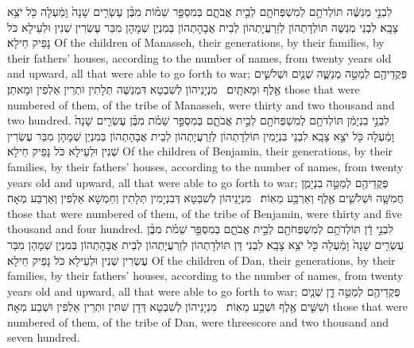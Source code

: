 {לִבְנֵ֣י מְנַשֶּׁ֔ה תּוֹלְדֹתָ֥ם לְמִשְׁפְּחֹתָ֖ם לְבֵ֣ית אֲבֹתָ֑ם בְּמִסְפַּ֣ר שֵׁמ֗וֹת מִבֶּ֨ן עֶשְׂרִ֤ים שָׁנָה֙ וָמַ֔עְלָה כֹּ֖ל יֹצֵ֥א צָבָֽא׃}
{לִבְנֵי מְנַשֶּׁה תּוֹלְדָתְהוֹן לְזַרְעֲיָתְהוֹן לְבֵית אֲבָהָתְהוֹן בְּמִנְיַן שְׁמָהָן מִבַּר עֶשְׂרִין שְׁנִין וּלְעֵילָא כֹּל נָפֵיק חֵילָא׃}
{Of the children of Manasseh, their generations, by their families, by their fathers’ houses, according to the number of names, from twenty years old and upward, all that were able to go forth to war;}{}
{פְּקֻדֵיהֶ֖ם לְמַטֵּ֣ה מְנַשֶּׁ֑ה שְׁנַ֧יִם וּשְׁלֹשִׁ֛ים אֶ֖לֶף וּמָאתָֽיִם׃ \petucha }
{מִנְיָנֵיהוֹן לְשִׁבְטָא דִּמְנַשֶּׁה תְּלָתִין וּתְרֵין אַלְפִין וּמָאתַן׃}
{those that were numbered of them, of the tribe of Manasseh, were thirty and two thousand and two hundred.}{}
{לִבְנֵ֣י בִנְיָמִ֔ן תּוֹלְדֹתָ֥ם לְמִשְׁפְּחֹתָ֖ם לְבֵ֣ית אֲבֹתָ֑ם בְּמִסְפַּ֣ר שֵׁמֹ֗ת מִבֶּ֨ן עֶשְׂרִ֤ים שָׁנָה֙ וָמַ֔עְלָה כֹּ֖ל יֹצֵ֥א צָבָֽא׃}
{לִבְנֵי בִּנְיָמִין תּוֹלְדָתְהוֹן לְזַרְעֲיָתְהוֹן לְבֵית אֲבָהָתְהוֹן בְּמִנְיַן שְׁמָהָן מִבַּר עֶשְׂרִין שְׁנִין וּלְעֵילָא כֹּל נָפֵיק חֵילָא׃}
{Of the children of Benjamin, their generations, by their families, by their fathers’ houses, according to the number of names, from twenty years old and upward, all that were able to go forth to war;}{}
{פְּקֻדֵיהֶ֖ם לְמַטֵּ֣ה בִנְיָמִ֑ן חֲמִשָּׁ֧ה וּשְׁלֹשִׁ֛ים אֶ֖לֶף וְאַרְבַּ֥ע מֵאֽוֹת׃ \petucha }
{מִנְיָנֵיהוֹן לְשִׁבְטָא דְּבִנְיָמִין תְּלָתִין וְחַמְשָׁא אַלְפִין וְאַרְבַּע מְאָה׃}
{those that were numbered of them, of the tribe of Benjamin, were thirty and five thousand and four hundred.}{}
{לִבְנֵ֣י דָ֔ן תּוֹלְדֹתָ֥ם לְמִשְׁפְּחֹתָ֖ם לְבֵ֣ית אֲבֹתָ֑ם בְּמִסְפַּ֣ר שֵׁמֹ֗ת מִבֶּ֨ן עֶשְׂרִ֤ים שָׁנָה֙ וָמַ֔עְלָה כֹּ֖ל יֹצֵ֥א צָבָֽא׃}
{לִבְנֵי דָּן תּוֹלְדָתְהוֹן לְזַרְעֲיָתְהוֹן לְבֵית אֲבָהָתְהוֹן בְּמִנְיַן שְׁמָהָן מִבַּר עֶשְׂרִין שְׁנִין וּלְעֵילָא כֹּל נָפֵיק חֵילָא׃}
{Of the children of Dan, their generations, by their families, by their fathers’ houses, according to the number of names, from twenty years old and upward, all that were able to go forth to war;}{}
{פְּקֻדֵיהֶ֖ם לְמַטֵּ֣ה דָ֑ן שְׁנַ֧יִם וְשִׁשִּׁ֛ים אֶ֖לֶף וּשְׁבַ֥ע מֵאֽוֹת׃ \petucha }
{מִנְיָנֵיהוֹן לְשִׁבְטָא דְּדָן שִׁתִּין וּתְרֵין אַלְפִין וּשְׁבַע מְאָה׃}
{those that were numbered of them, of the tribe of Dan, were threescore and two thousand and seven hundred.}{}
